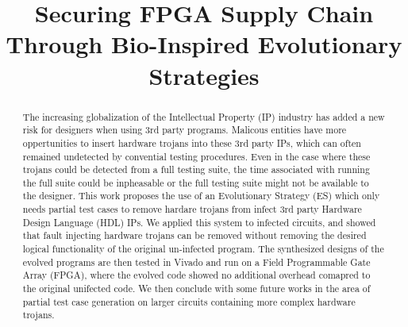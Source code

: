 \documentclass[conference]{IEEEtran}
\begin{document}
\title{Securing FPGA Supply Chain Through Bio-Inspired Evolutionary Strategies}


\author{
\and
{}
\and
{}
\and
{}
}

\maketitle

\begin{abstract}
The increasing globalization of the Intellectual Property (IP) industry has added a new risk for designers when using 3rd party programs.
Malicous entities have more oppertunities to insert hardware trojans into these 3rd party IPs, which can often remained undetected by convential testing procedures.
Even in the case where these trojans could be detected from a full testing suite, the time associated with running the full suite could be inpheasable or the full testing suite might not be available to the designer.
This work proposes the use of an Evolutionary Strategy (ES) which only needs partial test cases to remove hardare trojans from infect 3rd party Hardware Design Language (HDL) IPs.
We applied this system to infected circuits, and showed that fault injecting hardware trojans can be removed without removing the desired logical functionality of the original un-infected program.
The synthesized designs of the evolved programs are then tested in Vivado and run on a Field Programmable Gate Array (FPGA), where the evolved code showed no additional overhead comapred to the original unifected code.
We then conclude with some future works in the area of partial test case generation on larger circuits containing more complex hardware trojans.
\end{abstract}
\end{document}
